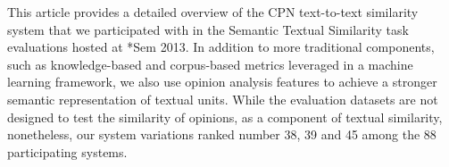 This article provides a detailed overview of the CPN text-to-text similarity system that we participated with in the Semantic Textual Similarity task
 evaluations hosted at *Sem 2013. In addition to more traditional components,
 such as knowledge-based and corpus-based metrics leveraged in a machine
 learning framework, we also use opinion analysis features to achieve a stronger
 semantic representation of textual units. While the evaluation datasets are not
 designed to test the similarity of opinions, as a component of textual
 similarity, nonetheless, our system variations ranked number 38, 39 and 45
 among the 88 participating systems.

